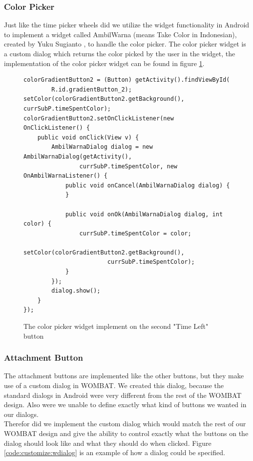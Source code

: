 \subsubsection*{Color Picker}
Just like the time picker wheels did we utilize the widget functionality in Android to implement a widget called AmbilWarna (means Take Color in Indonesian), created by Yuku Sugianto \cite{web:android:customize:color}, to handle the color picker.
The color picker widget is a custom dialog which returns the color picked by the user in the widget, the implementation of the color picker widget can be found in figure \ref{code:customize:color_picker}.
\begin{figure}[H]
\begin{lstlisting}
colorGradientButton2 = (Button) getActivity().findViewById(
		R.id.gradientButton_2);
setColor(colorGradientButton2.getBackground(), currSubP.timeSpentColor);
colorGradientButton2.setOnClickListener(new OnClickListener() {
	public void onClick(View v) {
		AmbilWarnaDialog dialog = new AmbilWarnaDialog(getActivity(),
				currSubP.timeSpentColor, new OnAmbilWarnaListener() {
			public void onCancel(AmbilWarnaDialog dialog) {
			}

			public void onOk(AmbilWarnaDialog dialog, int color) {
				currSubP.timeSpentColor = color;
				setColor(colorGradientButton2.getBackground(),
						currSubP.timeSpentColor);
			}
		});
		dialog.show();
	}
});
\end{lstlisting}
\caption{The color picker widget implement on the second "Time Left" button}%
\label{code:customize:color_picker}%
\end{figure}

\subsubsection*{Attachment Button}
The attachment buttons are implemented like the other buttons, but they make use of a custom dialog in WOMBAT.
We created this dialog, because the standard dialogs in Android were very different from the rest of the WOMBAT design.
Also were we unable to define exactly what kind of buttons we wanted in our dialogs.\\
Therefor did we implement the custom dialog which would match the rest of our WOMBAT design and give the ability to control exactly what the buttons on the dialog should look like and what they should do when clicked.
Figure \ref{code:customize:wdialog} is an example of how a dialog could be specified.

